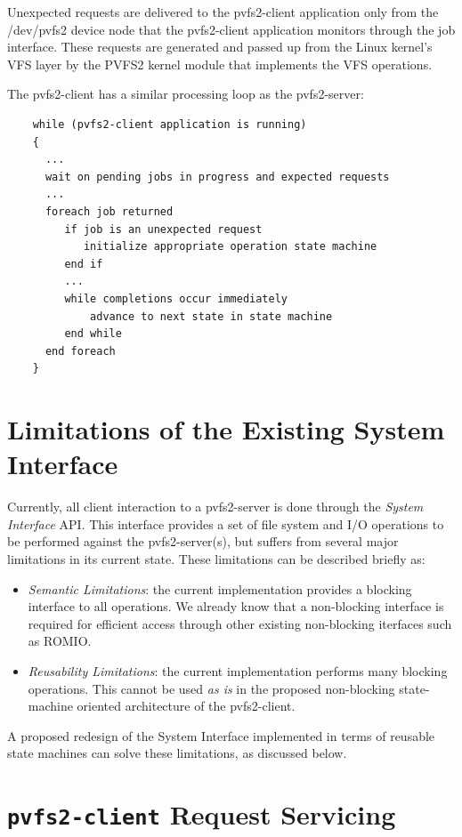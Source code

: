 \documentclass[11pt]{article}
\begin{document}
Unexpected requests are delivered to the pvfs2-client application only
from the /dev/pvfs2 device node that the pvfs2-client application
monitors through the job interface.  These requests are generated and
passed up from the Linux kernel's VFS layer by the PVFS2 kernel module
that implements the VFS operations.

The pvfs2-client has a similar processing loop as the pvfs2-server:

\begin{verbatim}
    while (pvfs2-client application is running)
    {
      ...
      wait on pending jobs in progress and expected requests
      ...
      foreach job returned
         if job is an unexpected request
            initialize appropriate operation state machine
         end if
         ...
         while completions occur immediately
             advance to next state in state machine
         end while
      end foreach
    }
\end{verbatim}

\section{Limitations of the Existing System Interface}

Currently, all client interaction to a pvfs2-server is done through
the {\it System Interface} API.  This interface provides a set of file
system and I/O operations to be performed against the pvfs2-server(s),
but suffers from several major limitations in its current state.
These limitations can be described briefly as:

\begin{itemize}
  \item \emph{Semantic Limitations}: the current implementation
    provides a blocking interface to all operations.  We already know
    that a non-blocking interface is required for efficient access
    through other existing non-blocking iterfaces such as ROMIO.
  \item \emph{Reusability Limitations}: the current implementation
    performs many blocking operations.  This cannot be used {\it as
    is} in the proposed non-blocking state-machine oriented
    architecture of the pvfs2-client.
\end{itemize}

A proposed redesign of the System Interface implemented in terms of
reusable state machines can solve these limitations, as discussed
below.

\section{\texttt{pvfs2-client} Request Servicing}
\end{document}
